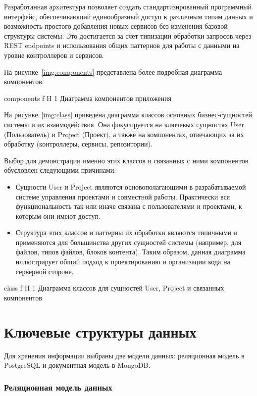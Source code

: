 Разработанная архитектура позволяет создать стандартизированный программный интерфейс, обеспечивающий единообразный доступ к различным типам данных и возможность простого добавления новых сервисов без изменения базовой структуры системы. 
Это достигается за счет типизации обработки запросов через REST endpoints и использования общих паттернов для работы с данными на уровне контроллеров и сервисов.

\clearpage
На рисунке~\ref{img:components} представлена более подробная диаграмма компонентов.

	{components}
	{f}
	{H}
	{1\textwidth}
	{Диаграмма компонентов приложения}


На рисунке~\ref{img:class} приведена диаграмма классов основных бизнес-сущностей системы и их взаимодействия.
Она фокусируется на ключевых сущностях User (Пользователь) и Project (Проект), а также на компонентах, отвечающих за их обработку (контроллеры, сервисы, репозитории).

Выбор для демонстрации именно этих классов и связанных с ними компонентов обусловлен следующими причинами:
\begin{itemize}[wide=12.5mm, leftmargin=12.5mm]
    \item Сущности User и Project являются основополагающими в разрабатываемой системе управления проектами и совместной работы. Практически вся функциональность так или иначе связана с пользователями и проектами, к которым они имеют доступ.
    \item Структура этих классов и паттерны их обработки являются типичными и применяются для большинства других сущностей системы (например, для файлов, типов файлов, блоков контента). Таким образом, данная диаграмма иллюстрирует общий подход к проектированию и организации кода на серверной стороне.
\end{itemize}

	{class}
	{f}
	{H}
	{1\textwidth}
	{Диаграмма классов для сущностей User, Project и связанных компонентов}

\section{Ключевые структуры данных}

Для хранения информации выбраны две модели данных: реляционная модель в PostgreSQL и документная модель в MongoDB.

\subsubsection{Реляционная модель данных}

